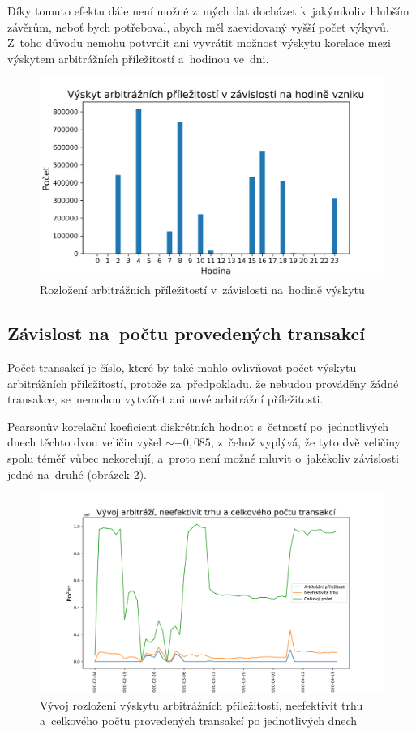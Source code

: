\documentclass[thesis=B,czech]{FITthesis}[2019/03/21]
\begin{document}
Díky tomuto efektu dále není možné z~mých dat docházet k~jakýmkoliv hlubším závěrům, neboť bych potřeboval, abych měl zaevidovaný vyšší počet výkyvů. Z~toho důvodu nemohu potvrdit ani vyvrátit možnost výskytu korelace mezi výskytem arbitrážních příležitostí a~hodinou ve~dni.

\begin{figure}\centering
	\includegraphics[width=1\textwidth]{images/hours_distribution.png}
	\caption{Rozložení arbitrážních příležitostí v~závislosti na~hodině výskytu }\label{hours_distribution}
\end{figure}
\subsection{Závislost na~počtu provedených transakcí}
Počet transakcí je číslo, které by také mohlo ovlivňovat počet výskytu arbitrážních příležitostí, protože za~předpokladu, že nebudou prováděny žádné transakce, se~nemohou vytvářet ani nové arbitrážní příležitosti.

Pearsonův korelační koeficient diskrétních hodnot s~četností po~jednotlivých dnech těchto dvou veličin vyšel \(\sim-0,085\), z~čehož vyplývá, že tyto dvě veličiny spolu téměř vůbec nekorelují, a~proto není možné mluvit o~jakékoliv závislosti jedné na~druhé (obrázek \ref{occurence_correlation}).

\begin{figure}\centering
	\includegraphics[width=1\textwidth]{images/occurence_correlation.png}
	\caption{Vývoj rozložení výskytu arbitrážních příležitostí, neefektivit trhu a~celkového počtu provedených transakcí po jednotlivých dnech}\label{occurence_correlation}
\end{figure}
\end{document}
